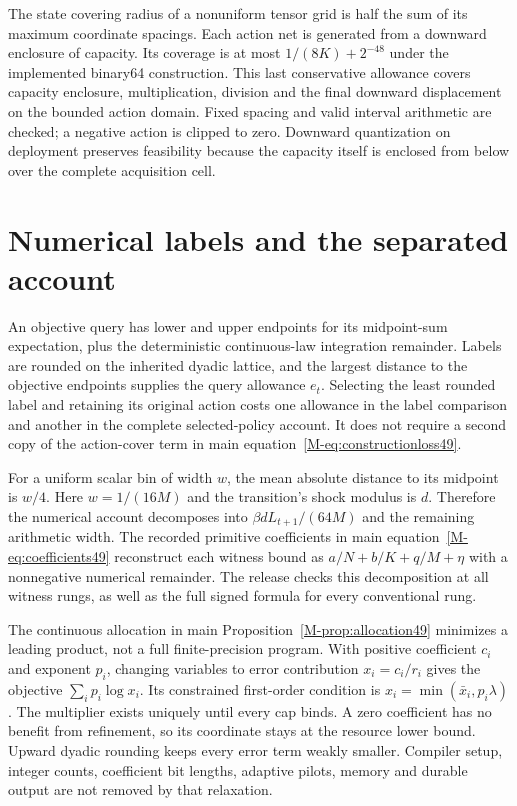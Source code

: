 \documentclass[ecta,nameyear,draft]{econsocart}
\begin{document}
The state covering radius of a nonuniform tensor grid is half the sum of its maximum coordinate spacings. Each action net is generated from a downward enclosure of capacity. Its coverage is at most $1/(8K)+2^{-48}$ under the implemented binary64 construction. This last conservative allowance covers capacity enclosure, multiplication, division and the final downward displacement on the bounded action domain. Fixed spacing and valid interval arithmetic are checked; a negative action is clipped to zero. Downward quantization on deployment preserves feasibility because the capacity itself is enclosed from below over the complete acquisition cell.

\section{Numerical labels and the separated account}\label{supp:numerical49}
An objective query has lower and upper endpoints for its midpoint-sum expectation, plus the deterministic continuous-law integration remainder. Labels are rounded on the inherited dyadic lattice, and the largest distance to the objective endpoints supplies the query allowance $e_t$. Selecting the least rounded label and retaining its original action costs one allowance in the label comparison and another in the complete selected-policy account. It does not require a second copy of the action-cover term in main equation~\eqref{M-eq:constructionloss49}.

For a uniform scalar bin of width $w$, the mean absolute distance to its midpoint is $w/4$. Here $w=1/(16M)$ and the transition's shock modulus is $d$. Therefore the numerical account decomposes into $\beta dL_{t+1}/(64M)$ and the remaining arithmetic width. The recorded primitive coefficients in main equation~\eqref{M-eq:coefficients49} reconstruct each witness bound as $a/N+b/K+q/M+\eta$ with a nonnegative numerical remainder. The release checks this decomposition at all witness rungs, as well as the full signed formula for every conventional rung.

The continuous allocation in main Proposition~\ref{M-prop:allocation49} minimizes a leading product, not a full finite-precision program. With positive coefficient $c_i$ and exponent $p_i$, changing variables to error contribution $x_i=c_i/r_i$ gives the objective $\sum_i p_i\log x_i$. Its constrained first-order condition is $x_i=\min(\bar x_i,p_i\lambda)$. The multiplier exists uniquely until every cap binds. A zero coefficient has no benefit from refinement, so its coordinate stays at the resource lower bound. Upward dyadic rounding keeps every error term weakly smaller. Compiler setup, integer counts, coefficient bit lengths, adaptive pilots, memory and durable output are not removed by that relaxation.
\end{document}
